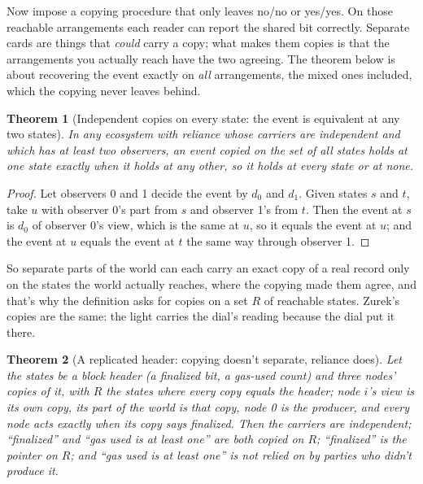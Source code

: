 \documentclass[11pt,twoside]{article}
\theoremstyle{thielethm}
\newtheorem{theorem}{Theorem}[section]
\theoremstyle{thieledef}
\theoremstyle{thieledef}
\theoremstyle{thieledef}
\theoremstyle{thielethm}
\theoremstyle{thieleobs}
\theoremstyle{thielethm}
\begin{document}
Now impose a copying procedure that only leaves no/no or yes/yes. On those
reachable arrangements each reader can report the shared bit correctly.
Separate cards are things that \emph{could} carry a copy; what makes them copies is that
the arrangements you actually reach have the two agreeing. The theorem below is about
recovering the event exactly on \emph{all} arrangements, the mixed ones included, which
the copying never leaves behind.

\begin{theorem}[Independent copies on every state: the event is equivalent at any two states]\label{thm:u14-independent-constant}
In any ecosystem with reliance whose carriers are independent and which has at least two observers,
an event copied on the set of all states holds at one state exactly when it holds at any other,
so it holds at every state or at none.
\end{theorem}

\begin{proof}
Let observers 0 and 1 decide the event by $d_0$ and $d_1$. Given states $s$ and $t$, take $u$ with
observer 0's part from $s$ and observer 1's from $t$. Then the event at $s$ is $d_0$ of observer
0's view, which is the same at $u$, so it equals the event at $u$; and the event at $u$ equals the
event at $t$ the same way through observer 1.
\end{proof}

So
separate parts of the world can each carry an exact copy of a real record only on the states the
world actually reaches, where the copying made them agree, and that's why the definition asks for
copies on a set $R$ of reachable states. Zurek's copies are the same: the light carries the
dial's reading because the dial put it there.

\begin{theorem}[A replicated header: copying doesn't separate, reliance does]\label{thm:u14-ledger}
Let the states be a block header (a finalized bit, a gas-used count) and three nodes' copies of it,
with $R$ the states where every copy equals the header; node $i$'s view is its own copy, its part of
the world is that copy, node 0 is the producer, and every node acts exactly when its copy says
finalized. Then the carriers are independent; ``finalized'' and ``gas used is at least one'' are
both copied on $R$; ``finalized'' is the pointer on $R$; and ``gas used is at least one'' is not
relied on by parties who didn't produce it.
\end{theorem}
\end{document}
